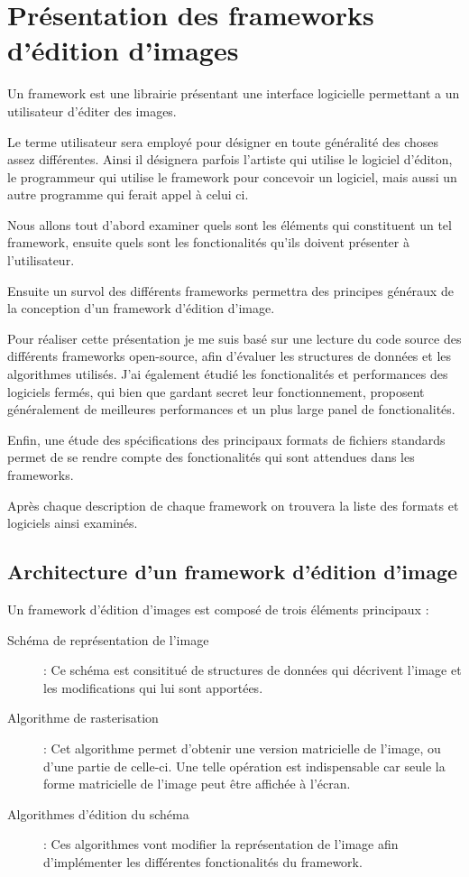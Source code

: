 	
\chapter{Présentation des frameworks d'édition d'images}
	

	Un framework est une librairie présentant une interface logicielle permettant a un utilisateur d'éditer des images. 
	
	Le terme utilisateur sera employé pour désigner en toute généralité des choses assez différentes. Ainsi il désignera parfois 
	l'artiste qui utilise le logiciel d'éditon, le programmeur qui utilise le framework pour
	concevoir un logiciel, mais aussi un autre programme qui ferait appel à celui ci.  

	Nous allons tout d'abord examiner quels sont les éléments qui constituent un tel framework, ensuite quels sont
	les fonctionalités qu'ils doivent présenter à l'utilisateur. 

	Ensuite un survol des différents frameworks permettra des principes généraux de la conception d'un framework d'édition d'image.
	
	Pour réaliser cette présentation je me suis basé sur une lecture du code source des différents frameworks open-source, afin d'évaluer
	les structures de données et les algorithmes utilisés. J'ai également étudié les fonctionalités et performances des logiciels fermés,
	qui bien que gardant secret leur fonctionnement, proposent généralement de meilleures performances et un plus large panel de fonctionalités.
	
	Enfin, une étude des spécifications des principaux formats de fichiers standards permet de se rendre compte des fonctionalités qui sont 
	attendues dans les frameworks. 

	Après chaque description de chaque framework on trouvera la liste des formats et logiciels ainsi examinés.

	\section{Architecture d'un framework d'édition d'image}
		Un framework d'édition d'images est composé de trois éléments principaux : 
		\begin{description}
			\item[Schéma de représentation de l'image]: Ce schéma est consititué de structures de données qui 
			décrivent l'image et les modifications qui lui sont apportées. 
			\item[Algorithme de rasterisation]: Cet algorithme permet d'obtenir une version matricielle de l'image,
			ou d'une partie de celle-ci. Une telle opération est indispensable car seule la forme matricielle de l'image
			peut être affichée à l'écran.
			\item[Algorithmes d'édition du schéma]: Ces algorithmes vont modifier la représentation de l'image afin 
			d'implémenter les différentes fonctionalités du framework.
		\end{description}

